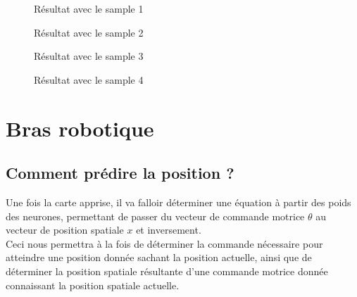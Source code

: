 \documentclass{article}
\begin{document}
\begin{figure}[H]
    \centering
    \hypertarget{figure-sample-1}{}
    \caption{Résultat avec le sample 1}
    \label{figure-sample-1}
\end{figure}

\begin{figure}[H]
    \centering
    \hypertarget{figure-sample-2}{}
    \caption{Résultat avec le sample 2}
    \label{figure-sample-2}
\end{figure}

\begin{figure}[H]
    \centering
    \hypertarget{figure-sample-3}{}
    \caption{Résultat avec le sample 3}
    \label{figure-sample-3}
\end{figure}

\begin{figure}[H]
    \centering
    \hypertarget{figure-sample-4}{}
    \caption{Résultat avec le sample 4}
    \label{figure-sample-4}
\end{figure}

\section{Bras robotique}


\subsection{Comment prédire la position ?}
Une fois la carte apprise, il va falloir déterminer une équation à partir des poids des neurones, permettant de passer du vecteur de commande motrice $\theta$ au vecteur de position spatiale $x$ et inversement.\\
Ceci nous permettra à la fois de déterminer la commande nécessaire pour atteindre une position donnée sachant la position actuelle, ainsi que de déterminer la position spatiale résultante d'une commande motrice donnée connaissant la position spatiale actuelle.
\end{document}
